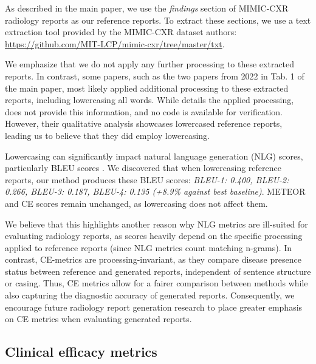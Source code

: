 \documentclass[10pt,twocolumn,letterpaper]{article}
\begin{document}
As described in the main paper, we use the \emph{findings} section of MIMIC-CXR radiology reports as our reference reports. To extract these sections, we use a text extraction tool provided by the MIMIC-CXR dataset authors: \url{https://github.com/MIT-LCP/mimic-cxr/tree/master/txt}.

We emphasize that we do not apply any further processing to these extracted reports. In contrast, some papers, such as the two papers \cite{nicolson2022improving, wang2022inclusive} from 2022 in Tab. 1 of the main paper, most likely applied additional processing to these extracted reports, including lowercasing all words. While \cite{nicolson2022improving} details the applied processing, \cite{wang2022inclusive} does not provide this information, and no code is available for verification. However, their qualitative analysis showcases lowercased reference reports, leading us to believe that they did employ lowercasing.

Lowercasing can significantly impact natural language generation (NLG) scores, particularly BLEU scores \cite{post2018call}. We discovered that when lowercasing reference reports, our method produces these BLEU scores: \emph{BLEU-1: 0.400, BLEU-2: 0.266, BLEU-3: 0.187, BLEU-4: 0.135 (+8.9\% against best baseline)}. METEOR and CE scores remain unchanged, as lowercasing does not affect them.

We believe that this highlights another reason why NLG metrics are ill-suited for evaluating radiology reports, as scores heavily depend on the specific processing applied to reference reports (since NLG metrics count matching n-grams). In contrast, CE-metrics are processing-invariant, as they compare disease presence status between reference and generated reports, independent of sentence structure or casing. Thus, CE metrics allow for a fairer comparison between methods while also capturing the diagnostic accuracy of generated reports. Consequently, we encourage future radiology report generation research to place greater emphasis on CE metrics when evaluating generated reports.

\subsection{Clinical efficacy metrics}
\label{clinical-efficacy-metrics}
\end{document}
